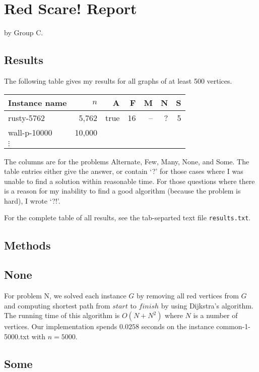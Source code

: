 \documentclass{tufte-handout}
\begin{document}
\section{Red Scare! Report}

by Group C.

\subsection{Results}

The following table gives my results for all graphs of at least 500 vertices.

\medskip
\begin{tabular}{lrrrrrr}
  \toprule
  Instance name & $n$ & A & F & M & N & S \\
  \midrule
  rusty-5762 & 5,762 & true & 16 & -- & ? & 5 \\
  wall-p-10000 & 10,000 &\\	
  $\vdots$\\
  \bottomrule
\end{tabular}
\medskip

The columns are for the problems Alternate, Few, Many, None, and Some.
The table entries either give the answer, or contain `?' for those cases where I was unable to find a solution within reasonable time.
For those questions where there is a reason for my inability to find a good algorithm (because the problem is hard), I wrote `?!'.

For the complete table of all results, see the tab-separted text file {\tt results.txt}.

\subsection{Methods}

\subsection{None}

For problem N, we solved each instance $G$ by removing all red vertices from $G$ and computing shortest path from $start$ to $finish$  by using Dijkstra's algorithm. 
The running time of this algorithm is $O(N + N^2)$ where $N$ is a number of vertices. Our implementation spends $0.0258$ seconds on the instance common-1-5000.txt with $n=5000$.

\subsection{Some}
\end{document}
